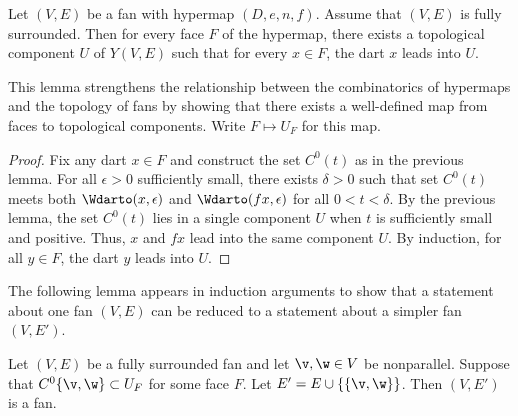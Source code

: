 \begin{lemma} \label{lemma:UF}
Let $(V,E)$ be a fan with hypermap $(D,e,n,f)$.  Assume that $(V,E)$
is fully surrounded.  Then for every face $F$ of the hypermap, there
exists a topological component $U$ of $Y(V,E)$ such that for every
$x\in F$, the dart $x$ leads into $U$.
\end{lemma}
%
%
%

This lemma strengthens the relationship between the
combinatorics of hypermaps and the topology of fans by showing that there exists a
well-defined map from faces to topological components.  Write
$F\mapsto U_F$ for this map.
%

\begin{proof} Fix any dart $x\in F$ and construct the set $C^0(t)$ as
in the previous lemma.  For all $\epsilon>0$ sufficiently small,
there exists $\delta>0$ such that set $C^0(t)$ meets both
$\Wdarto(x,\epsilon)$ and $\Wdarto(f x,\epsilon)$ for all
$0<t<\delta$.  By the previous lemma, the set $C^0(t)$ lies in a
single component $U$ when $t$ is sufficiently small and positive.
Thus, $x$ and $f x$ lead into the same component $U$.  By induction,
for all $y\in F$, the dart $y$ leads into $U$.
\end{proof}

The following lemma appears in induction arguments to show
that a statement about one fan $(V,E)$ can be reduced to a statement
about a simpler fan $(V,E')$.

\begin{lemma}\cutrate{}\label{lemma:add-edge}
  Let $(V,E)$ be a fully surrounded fan and let $\v,\w\in V$ be
  nonparallel.  Suppose that $C^0\{\v,\w\}\subset U_F$ for some face
  $F$.  Let $E' = E\cup\{\{\v,\w\}\}$.  Then $(V,E')$ is a fan.
\end{lemma}

